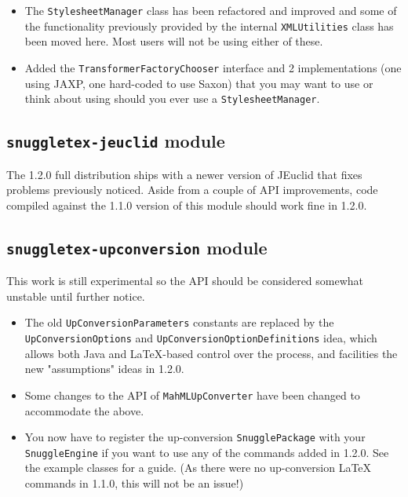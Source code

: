 \begin{itemize}
\item The \verb|StylesheetManager| class has been refactored and improved and some of the
functionality previously provided by the internal \verb|XMLUtilities| class has been moved here.
Most users will not be using either of these.

\item Added the \verb|TransformerFactoryChooser| interface and 2 implementations (one using JAXP,
one hard-coded to use Saxon) that you may want to use or think about using should you ever use
a \verb|StylesheetManager|.

\end{itemize}

\subsection*{\verb|snuggletex-jeuclid| module}

The 1.2.0 full distribution ships with a newer version of JEuclid that fixes
problems previously noticed. Aside from a couple of API improvements, code compiled against
the 1.1.0 version of this module should work fine in 1.2.0.
\subsection*{\verb|snuggletex-upconversion| module}

This work is still experimental so the API should be considered somewhat unstable until
further notice.

\begin{itemize}

\item The old \verb|UpConversionParameters| constants are replaced by the
\verb|UpConversionOptions| and \verb|UpConversionOptionDefinitions| idea, which allows
both Java and LaTeX-based control over the process, and facilities the new "assumptions"
ideas in 1.2.0.

\item Some changes to the API of \verb|MahMLUpConverter| have been changed to accommodate
the above.

\item You now have to register the up-conversion \verb|SnugglePackage| with your \verb|SnuggleEngine|
if you want to use any of the commands added in 1.2.0. See the example classes for a guide. (As there
were no up-conversion LaTeX commands in 1.1.0, this will not be an issue!)

\end{itemize}
